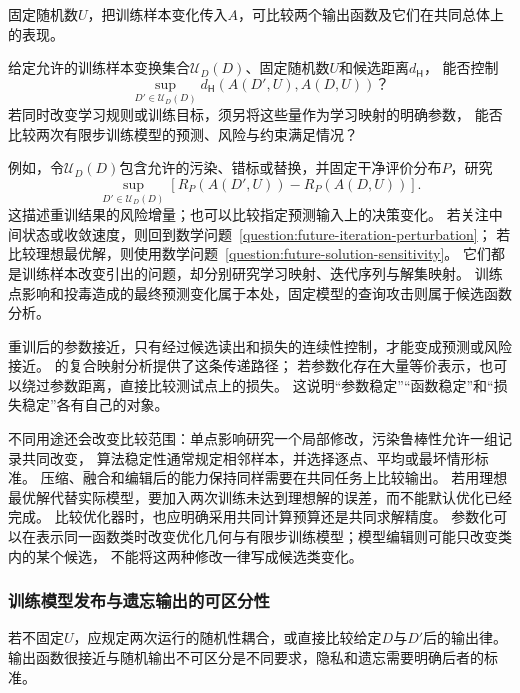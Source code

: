 固定随机数$U$，把训练样本变化传入$A$，可比较两个输出函数及它们在共同总体上的表现。

\begin{mathproblem}[训练样本变换造成的训练模型差异]
  \label{question:future-perturbation-map}
  给定允许的训练样本变换集合$\mathcal U_D(D)$、固定随机数$U$和候选距离$d_{\mathsf H}$，
  能否控制
  \[
    \sup_{D'\in\mathcal U_D(D)}
      d_{\mathsf H}(A(D',U),A(D,U))\text{？}
  \]
  若同时改变学习规则或训练目标，须另将这些量作为学习映射的明确参数，
  能否比较两次有限步训练模型的预测、风险与约束满足情况？
\end{mathproblem}

例如，令$\mathcal U_D(D)$包含允许的污染、错标或替换，并固定干净评价分布$P$，研究
\begin{equation}
  \sup_{D'\in\mathcal U_D(D)}
  \left[R_P(A(D',U))-R_P(A(D,U))\right].
  \label{eq:future-training-robustness-question}
\end{equation}
这描述重训结果的风险增量；也可以比较指定预测输入上的决策变化。
若关注中间状态或收敛速度，则回到数学问题~\ref{question:future-iteration-perturbation}；
若比较理想最优解，则使用数学问题~\ref{question:future-solution-sensitivity}。
它们都是训练样本改变引出的问题，却分别研究学习映射、迭代序列与解集映射。
训练点影响和投毒造成的最终预测变化属于本处，固定模型的查询攻击则属于候选函数分析。

重训后的参数接近，只有经过候选读出和损失的连续性控制，才能变成预测或风险接近。
的复合映射分析提供了这条传递路径；
若参数化存在大量等价表示，也可以绕过参数距离，直接比较测试点上的损失。
这说明“参数稳定”“函数稳定”和“损失稳定”各有自己的对象。

不同用途还会改变比较范围：单点影响研究一个局部修改，污染鲁棒性允许一组记录共同改变，
算法稳定性通常规定相邻样本，并选择逐点、平均或最坏情形标准。
压缩、融合和编辑后的能力保持同样需要在共同任务上比较输出。
若用理想最优解代替实际模型，要加入两次训练未达到理想解的误差，而不能默认优化已经完成。
比较优化器时，也应明确采用共同计算预算还是共同求解精度。
参数化可以在表示同一函数类时改变优化几何与有限步训练模型；模型编辑则可能只改变类内的某个候选，
不能将这两种修改一律写成候选类变化。

\subsubsection{训练模型发布与遗忘输出的可区分性}
\label{sec:future-analysis-output-law}

若不固定$U$，应规定两次运行的随机性耦合，或直接比较给定$D$与$D'$后的输出律。
输出函数很接近与随机输出不可区分是不同要求，隐私和遗忘需要明确后者的标准。

